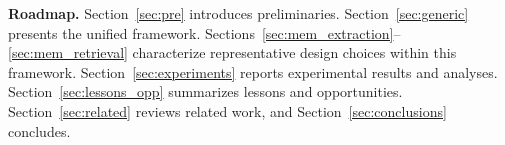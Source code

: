 {{%

\textbf{Roadmap.} Section~\ref{sec:pre} introduces preliminaries. Section~\ref{sec:generic} presents the unified framework. Sections~\ref{sec:mem_extraction}--\ref{sec:mem_retrieval} characterize representative design choices within this framework. Section~\ref{sec:experiments} reports experimental results and analyses. Section~\ref{sec:lessons_opp} summarizes lessons and opportunities. Section~\ref{sec:related} reviews related work, and Section~\ref{sec:conclusions} concludes.

     
    
}}
